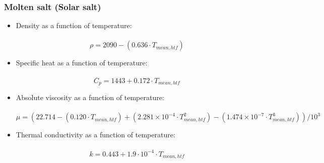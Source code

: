 \subsubsection{Molten salt (Solar salt)}
\begin{itemize}
	\item Density as a function of temperature:\\\\
	\begin{equation}
		\rho = 2090 - (0.636 \cdot T_{mean,htf})
	\end{equation}
	\item Specific heat as a function of temperature:\\\\
	\begin{equation}
	C_{p} = 1443 + 0.172 \cdot T_{mean,htf}
	\end{equation}
	\item Absolute viscosity as a function of temperature:\\\\
	\begin{equation}
	\mu = (22.714 - (0.120 \cdot T_{mean,htf}) + (2.281 \times 10^{-4} \cdot T_{mean,htf}^2) - (1.474 \times 10^{-7} \cdot T_{mean,htf}^3)) / 10^3
	\end{equation}
	\item Thermal conductivity as a function of temperature:\\\\
	\begin{equation}
	k = 0.443 + 1.9 \cdot 10^{-4} \cdot T_{mean,htf}
	\end{equation}
\end{itemize}
